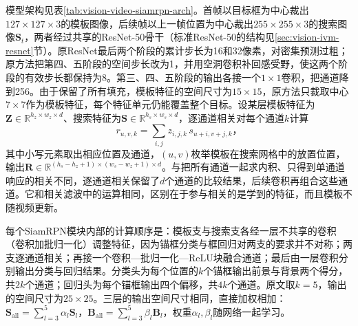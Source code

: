 模型架构见表\ref{tab:vision-video-siamrpn-arch}。首帧以目标框为中心裁出$127\times127\times3$的模板图像，后续帧以上一帧位置为中心裁出$255\times255\times3$的搜索图像$\bm{S}_t$，两者经过共享的ResNet-50骨干（标准ResNet-50的结构见\ref{sec:vision-ivm-resnet}节）。原ResNet最后两个阶段的累计步长为16和32像素，对密集预测过粗；原方法把第四、五阶段的空间步长改为1，并用空洞卷积补回感受野，使这两个阶段的有效步长都保持为8。第三、四、五阶段的输出各接一个$1\times1$卷积，把通道降到256。由于保留了所有填充，模板特征的空间尺寸为$15\times15$，原方法只裁取中心$7\times7$作为模板特征，每个特征单元仍能覆盖整个目标。设某层模板特征为$\bm{Z}\in\mathbb{R}^{h_z\times w_z\times d}$、搜索特征为$\bm{S}\in\mathbb{R}^{h_s\times w_s\times d}$，逐通道相关对每个通道$k$计算
\begin{equation}
  r_{u,v,k}=\sum_{i,j}z_{i,j,k}\,s_{u+i,v+j,k}\text{，}
  \label{eq:vision-video-depthwise-correlation}
\end{equation}
其中小写元素取出相应位置及通道，$(u,v)$枚举模板在搜索网格中的放置位置，输出$\bm{R}\in\mathbb{R}^{(h_s-h_z+1)\times(w_s-w_z+1)\times d}$。与把所有通道一起求内积、只得到单通道响应的相关不同，逐通道相关保留了$d$个通道的比较结果，后续卷积再组合这些通道。它和相关滤波中的运算相同，区别在于参与相关的是学到的特征，而且模板不随视频更新。

每个SiamRPN模块内部的计算顺序是：模板支与搜索支各经一层不共享的卷积（卷积加批归一化）调整特征，因为锚框分类与框回归对两支的要求并不对称；两支逐通道相关；再接一个卷积—批归一化—ReLU块融合通道；最后由一层卷积分别输出分类与回归结果。分类头为每个位置的$k$个锚框输出前景与背景两个得分，共$2k$个通道；回归头为每个锚框输出四个偏移，共$4k$个通道。原文取$k=5$，输出的空间尺寸为$25\times25$。三层的输出空间尺寸相同，直接加权相加：$\bm{S}_{\mathrm{all}}=\sum_{l=3}^{5}\alpha_l\bm{S}_l$，$\bm{B}_{\mathrm{all}}=\sum_{l=3}^{5}\beta_l\bm{B}_l$，权重$\alpha_l,\beta_l$随网络一起学习。

